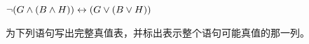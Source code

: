 \begin{compactlist}
\item $\neg(G \wedge (B \wedge H)) \leftrightarrow (G \vee (B \vee H))$
%


\end{compactlist}

\problempart
为下列语句写出完整真值表，并标出表示整个语句可能真值的那一列。

